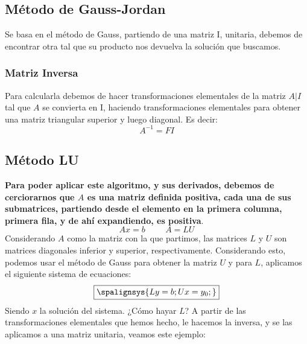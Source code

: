 \subsection{Método de Gauss-Jordan}
Se basa en el método de Gauss, partiendo de una matriz I, unitaria, debemos de encontrar otra tal que su producto nos devuelva la solución que buscamos.
\subsubsection{Matriz Inversa}
Para calcularla debemos de hacer transformaciones elementales de la matriz \(A|I\) tal que \(A\) se convierta en I, haciendo transformaciones elementales para obtener una matriz triangular superior y luego diagonal. Es decir:
\[
        A^{-1} = FI
\]
\subsection{Método LU}
\textbf{Para poder aplicar este algoritmo, y sus derivados, debemos de cerciorarnos que \(A\) es una matriz definida positiva, cada una de sus submatrices, partiendo desde el elemento en la primera columna, primera fila, y de ahí expandiendo, es positiva}.
\[
        Ax = b \hspace{1cm} A = LU
\]
Considerando \(A\) como la matriz con la que partimos, las matrices \(L\) y \(U\) son matrices diagonales inferior y superior, respectivamente. Considerando esto, podemos usar el método de Gauss para obtener la matriz \(U\) y para \(L\), aplicamos el siguiente sistema de ecuaciones:
\[
        \boxed{
                \spalignsys{
                        Ly = b ;
                        Ux = y_0;
                }}
\]
Siendo \(x\) la solución del sistema. ¿Cómo hayar \(L\)? A partir de las transformaciones elementales que hemos hecho, le hacemos la inversa, y se las aplicamos a una matriz unitaria, veamos este ejemplo:

